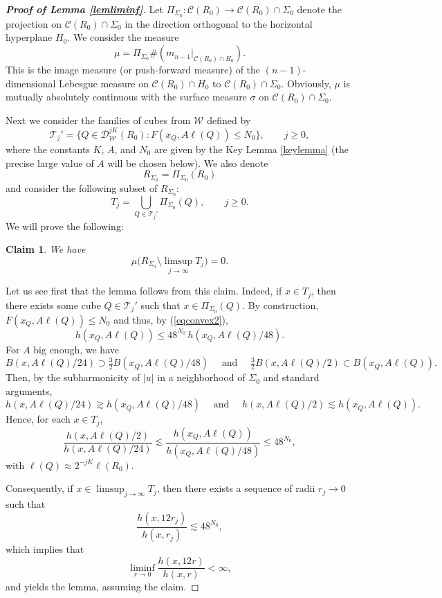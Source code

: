 \documentclass[11pt]{amsart}
\newcommand{\DD}{{\mathcal D}}
\newcommand{\WW}{{\mathcal W}}
\newcommand{\TT}{{\mathcal T}}
\newcommand{\CC}{{\mathcal C}}
\newcommand{\rf}[1]{{(\ref{#1})}}
\newcommand{\vv}{{\vspace{2mm}}}
\newtheorem*{claim*}{Claim}
\theoremstyle{definition}
\theoremstyle{remark}
\numberwithin{equation}{section}
\begin{document}
\vv
\begin{proof}[\bf Proof of Lemma \ref{lemliminf}]
Let $\Pi_{\Sigma_0}:\CC(R_0)\to \CC(R_0)\cap\Sigma_0$ denote the projection on $\CC(R_0)\cap\Sigma_0$ in the direction orthogonal to the
horizontal hyperplane $H_0$. We consider the measure $$\mu=\Pi_{\Sigma_0}\# (m_{n-1}|_{\CC(R_0)\cap H_0}).$$ This is the image measure (or push-forward measure) of the $(n-1)$-dimensional Lebesgue measure on $\CC(R_0)\cap H_0$ to $\CC(R_0)\cap\Sigma_0$. Obviously, $\mu$ is mutually absolutely continuous with 
the surface measure $\sigma$ on $\CC(R_0)\cap\Sigma_0$. 

Next we consider the families of cubes from $\WW$ defined by
\begin{equation}\label{deftj}
\TT_j' = \big\{ Q\in\DD_\WW^{jK}(R_0): F(x_Q,A\ell(Q))\leq N_0\big\}, \qquad j\geq0,
\end{equation}
where the constants $K$, $A$, and $N_0$ are given by the Key Lemma \ref{keylemma} (the precise large value of $A$
will be chosen below).
We also denote
$$R_{\Sigma_0} = \Pi_{\Sigma_0}(R_0)$$
and consider the following subset of $R_{\Sigma_0}$:
$$T_j = \bigcup_{Q\in\TT_j'} \Pi_{\Sigma_0}(Q),\qquad j\geq 0.$$
We will prove the following:

\begin{claim*}
We have
$$\mu\Big(R_{\Sigma_0} \setminus \limsup_{j\to\infty}  T_j\Big)=0.$$
\end{claim*}

Let us see first that the lemma follows from this claim. Indeed, if $x\in T_j$, then there exists
some cube $Q\in\TT_j'$ such that $x\in \Pi_{\Sigma_0}(Q)$.
By construction, $F(x_Q,A\ell(Q))\leq N_0$ and thus, by \rf{eqconvex2},
$$h(x_Q,A\ell(Q))\leq 48^{N_0}\,h(x_Q,A\ell(Q)/48).$$
For $A$ big enough, we have 
$$B(x,A\ell(Q)/24)\supset \tfrac32 B(x_Q,A\ell(Q)/48) \quad\mbox{ and } \quad
\tfrac32 B(x,A\ell(Q)/2)\subset B(x_Q,A\ell(Q)).$$
Then, by the subharmonicity of $|u|$ in a neighborhood of $\Sigma_0$ and standard arguments,
$$h(x,A\ell(Q)/24)\gtrsim h(x_Q,A\ell(Q)/48)\quad \mbox{ and } \quad
h(x,A\ell(Q)/2)\lesssim h(x_Q,A\ell(Q)).$$
Hence, for each $x\in T_j$,
$$\frac{h(x,A\ell(Q)/2)}{h(x,A\ell(Q)/24)} \lesssim 
\frac{h(x_Q,A\ell(Q))}{h(x_Q,A\ell(Q)/48)} \leq 48^{N_0},$$
with $\ell(Q)\approx 2^{-jK}\ell(R_0)$.

Consequently, if $x\in\limsup_{j\to\infty}  T_j$, then there exists a sequence of radii $r_j\to0$ such that
$$\frac{h(x,12r_j)}{h(x,r_j)} \lesssim  48^{N_0},$$
which implies that
$$\liminf_{r\to 0} \frac{h(x,12r)}{h(x,r)} <\infty,$$
and yields the lemma, assuming the claim.


\end{proof}
\end{document}
